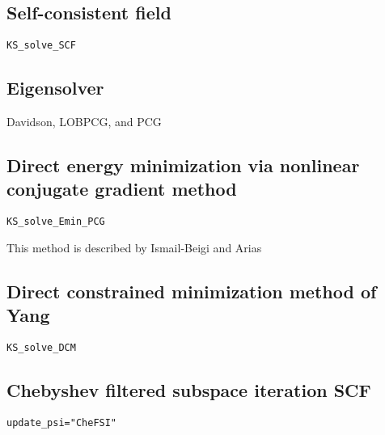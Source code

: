 \documentclass[a4paper,10pt]{paper}
\newcommand{\jlcode}[1]{\texttt{#1}}
\begin{document}
\subsection{Self-consistent field}
\jlcode{KS_solve_SCF}


\subsection{Eigensolver}

Davidson, LOBPCG, and PCG

\subsection{Direct energy minimization via nonlinear conjugate gradient method}

\jlcode{KS_solve_Emin_PCG}

This method is described by Ismail-Beigi and Arias

\subsection{Direct constrained minimization method of Yang}

\jlcode{KS_solve_DCM}

\subsection{Chebyshev filtered subspace iteration SCF}

\jlcode{update_psi="CheFSI"}
\end{document}
